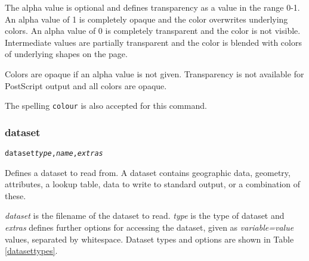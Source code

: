 The alpha value is optional and defines transparency as a value in the range
0-1.  An alpha value of 1 is completely opaque and the color overwrites
underlying colors.  An alpha value of 0 is completely transparent and the color
is not visible.  Intermediate values are partially transparent and the color is
blended with colors of underlying shapes on the page.

Colors are opaque if an alpha value is not given.  Transparency is not
available for PostScript output and all colors are opaque.

The spelling \texttt{colour} is also accepted for this command.

\subsubsection{dataset}

\begin{alltt}
dataset \textit{type}, \textit{name}, \textit{extras}
\end{alltt}

Defines a dataset to read from.  A dataset contains geographic data,
geometry, attributes, a lookup table, data to write to standard
output, or a combination of these.

\textit{dataset} is the filename of the dataset to read.
\textit{type} is the type of dataset and
\textit{extras} defines further options for accessing the dataset, given
as \textit{variable=value} values, separated by whitespace.
Dataset types and options are shown in Table \ref{datasettypes}.


